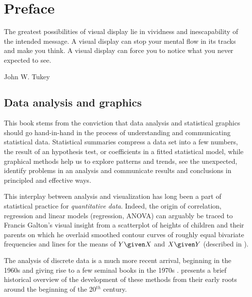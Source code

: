 \chapter*{Preface}


\epigraph{The greatest possibilities of visual display lie in vividness and inescapability of the intended message.
A visual display can stop your mental flow in its tracks and make you think.
A visual display can force you to notice what you never expected to see.}{John W. Tukey \cite{Tukey:90}}



\section*{Data analysis and graphics}

This book stems from the conviction that data analysis and statistical graphics should
go hand-in-hand in the process of understanding and communicating statistical data.
Statistical summaries compress a data set into a few numbers, the result of an
hypothesis test, or coefficients in a fitted statistical model,
while graphical methods help us to explore patterns and trends, see the unexpected,
identify problems in an analysis and communicate results and conclusions in 
principled and effective ways. 

This interplay between analysis and visualization has long been a part of 
statistical practice for \emph{quantitative data}.  Indeed, the origin
of correlation, regression and linear models (regression, ANOVA) can
arguably be traced to Francis Galton's \citeyearpar{Galton:1886}
visual insight from a scatterplot of heights of children and their parents
on which he overlaid smoothed contour curves of roughly equal bivariate frequencies
and lines for the means of $Y \given X$ and $X \given Y$
(described in \citet{FriendlyDenis:05:scat,Friendly-etal:ellipses:2013}).

The analysis of discrete data is a much more recent arrival, beginning in the
1960s and giving rise to a few seminal books in the 1970s
\citep{Bishop-etal:75,Haberman:74, Goodman:1978,Fienberg:80}.
\citet[]{Agresti:2013} presents a brief historical overview of the
development of these methods from their early roots around the beginning
of the 20$^{th}$ century.

